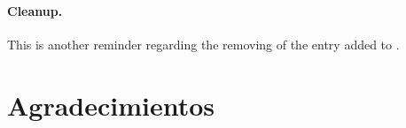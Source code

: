 

\paragraph{Cleanup.} This is another reminder regarding the 
removing of the entry added to . 

\section*{Agradecimientos}





